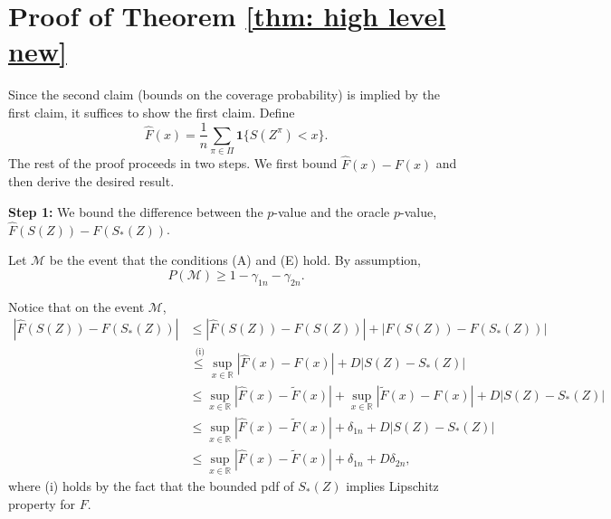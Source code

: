 \documentclass[final,12pt]{colt2018} %
\newcommand{\yinchu}[1]{\textcolor{teal}{Yinchu: #1}}
\begin{document}
\section{Proof of Theorem \ref{thm: high level new}}

Since the second claim (bounds on the coverage probability) is implied by the first claim, it suffices to show the first claim. Define $$ \hat{F}(x)=\frac{1}{n} \sum_{\pi\in\Pi} \mathbf{1}\{S(Z^\pi)<x \}. $$
The rest of the proof proceeds in two steps. We first bound $\hat{F}(x)-F(x) $ and then derive the desired result.



\textbf{Step 1:} We bound the difference between the $p$-value and the oracle $p$-value, $\hat{F}(S(Z))-F(S_*(Z))$.

Let $\mathcal{M}$ be the event that the conditions (A) and (E) hold. By assumption, 
\begin{equation}
P\left(\mathcal{M}\right)\geq1-\gamma_{1n}-\gamma_{2n}.\label{eq: thm high level eq 0.5}
\end{equation}

Notice that on the event $\mathcal{M}$, 
\begin{align}
\left|\hat{F}(S(Z))-F(S_*(Z))\right| & \leq\left|\hat{F}(S(Z))-F(S(Z))\right|+\left|F(S(Z))-F(S_*(Z))\right|\nonumber \\
 & \overset{\text{ (i)}}{\leq}\sup_{x\in\mathbb{R}}\left|\hat{F}(x)-F(x)\right|+D\left|S(Z)-S_*(Z)\right|\nonumber \\
 & \leq\sup_{x\in\mathbb{R}}\left|\hat{F}(x)-\tilde{F}(x)\right|+\sup_{x\in\mathbb{R}}\left|\tilde{F}(x)-F(x)\right|+D\left|S(Z)-S_*(Z)\right|\nonumber \\
 & \leq\sup_{x\in\mathbb{R}}\left|\hat{F}(x)-\tilde{F}(x)\right|+\delta_{1n}+D\left|S(Z)-S_*(Z)\right|\nonumber \\
 & \leq\sup_{x\in\mathbb{R}}\left|\hat{F}(x)-\tilde{F}(x)\right|+\delta_{1n}+D\delta_{2n},\label{eq: thm high level eq 1}
\end{align}
where (i) holds by the fact that the bounded pdf of $S_*(Z)$ implies
Lipschitz property for $F$. 
\end{document}
